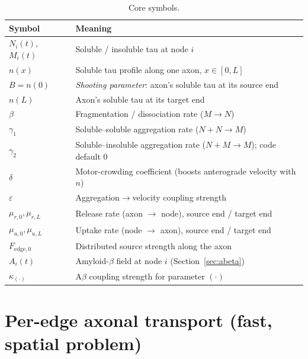 ﻿\documentclass[11pt]{article}
\begin{document}
\begin{table}[h]
\centering
\caption{Core symbols.}
\begin{tabular}{@{}ll@{}}
\toprule
Symbol & Meaning \\
\midrule
$N_i(t)$, $M_i(t)$ & Soluble / insoluble tau at node $i$ \\
$n(x)$ & Soluble tau profile along one axon, $x\in[0,L]$ \\
$B = n(0)$ & \emph{Shooting parameter}: axon's soluble tau at its source end \\
$n(L)$ & Axon's soluble tau at its target end \\
$\beta$ & Fragmentation / dissociation rate ($M \to N$) \\
$\gamma_1$ & Soluble--soluble aggregation rate ($N+N \to M$) \\
$\gamma_2$ & Soluble--insoluble aggregation rate ($N+M \to M$); code default $0$ \\
$\delta$ & Motor-crowding coefficient (boosts anterograde velocity with $n$) \\
$\varepsilon$ & Aggregation$\to$velocity coupling strength \\
$\mu_{r,0},\mu_{r,L}$ & Release rate (axon $\to$ node), source end / target end \\
$\mu_{u,0},\mu_{u,L}$ & Uptake rate (node $\to$ axon), source end / target end \\
$F_{\mathrm{edge},0}$ & Distributed source strength along the axon \\
$A_i(t)$ & Amyloid-$\beta$ field at node $i$ (Section~\ref{sec:abeta}) \\
$\kappa_{(\cdot)}$ & A$\beta$ coupling strength for parameter $(\cdot)$ \\
\bottomrule
\end{tabular}
\end{table}

\section{Per-edge axonal transport (fast, spatial problem)}
\label{sec:axon}
\end{document}

